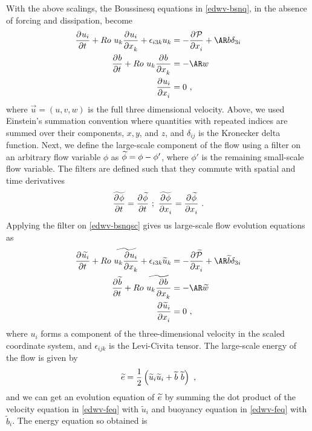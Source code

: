 \documentclass[../Rajarshi-thesis-draft.tex]{subfiles}
\begin{document}
With the above scalings, the Boussinesq equations in \eqref{edwv-bsnq}, in the absence of forcing and dissipation, become
\begin{align}
 \label{edwv-bsnqsc}
 \begin{split}
 \Dp{u_i}{t}{}+ Ro~ u_k\Dp{ u_i}{x_k}{}+ \epsilon_{i3k} u_k &= - \Dp{\mathcal{P}}{x_i}{} + \AR b \delta_{3i} \\
 \Dp{b}{t}{} + Ro~ u_k\Dp{b}{x_k}{} &= - \AR w \\
 \Dp{u_i}{x_i}{} &= 0 \ ,
 \end{split}
\end{align}
where $\vec{u} = (u,v,w)$ is the full three dimensional velocity. Above, we used Einstein's summation convention where quantities with repeated indices are summed over their components, $x,y$, and $z$, and $\delta_{ij}$ is the Kronecker delta function. Next, we define the large-scale component of the flow using a filter on an arbitrary flow variable $\phi$ as $\widetilde{\phi} = \phi - \phi'$, where $\phi'$ is the remaining small-scale flow variable. The filters are defined such that they commute with spatial and time derivatives
\begin{align}
 \begin{split}
 \widetilde{\frac{\partial^{} \phi}{\partial t^{}}} = \frac{\partial^{} \widetilde{\phi}}{\partial t^{}} \ ; \ \widetilde{\frac{\partial^{} \phi}{\partial x_i^{}}} = \frac{\partial^{} \widetilde{\phi}}{\partial x_i^{}} \ . 
 \end{split}
\end{align}
Applying the filter on \eqref{edwv-bsnqsc} gives us large-scale flow evolution equations as 
\begin{align}
\label{edwv-feq}
 \begin{split}
 \Dp{\t{u_i}}{t}{}+ Ro~ \t{u_k\Dp{ u_i}{x_k}{}}+ \epsilon_{i3k} \t{u}_k &= - \Dp{\t{\mathcal{P}}}{x_i}{} + \AR \t{b} \delta_{3i} \\
 \Dp{\t{b}}{t}{} + Ro~ \t{u_k\Dp{b}{x_k}{}} &= - \AR \t{w} \\
 \Dp{\t{u}_i}{x_i}{} &= 0 \ ,
 \end{split}
\end{align}
where $u_i$ forms a component of the three-dimensional velocity in the scaled coordinate system, and $\epsilon_{ijk}$ is the  Levi-Civita tensor. The large-scale energy of the flow is given by
\begin{align}
 \begin{split}
 \widetilde{e} = \frac{1}{2}\left(\widetilde{u}_i \widetilde{u}_i + \widetilde{b}~\widetilde{b} \right) \ , 
 \end{split}
\end{align}
and we can get an evolution equation of $\widetilde{e}$ by summing the dot product of the velocity equation in \eqref{edwv-feq} with $\tilde u_i$ and buoyancy equation in \eqref{edwv-feq} with $\tilde b_i$. The energy equation so obtained is 
\end{document}
